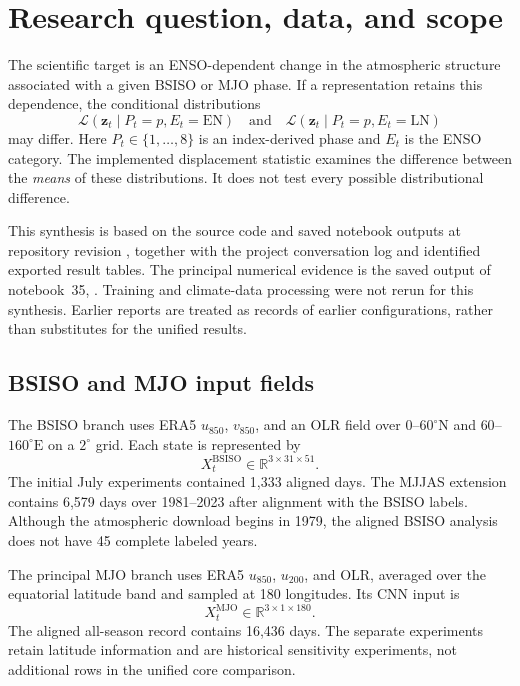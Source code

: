 \documentclass[11pt]{article}
\newcommand{\EN}{\mathrm{EN}}
\newcommand{\LN}{\mathrm{LN}}
\newcommand{\R}{\mathbb{R}}
\newcommand{\code}[1]{\texttt{\detokenize{#1}}}
\begin{document}
\section{Research question, data, and scope}
\label{sec:data}

The scientific target is an ENSO-dependent change in the atmospheric structure associated with a given BSISO or MJO phase. If a representation retains this dependence, the conditional distributions
\begin{equation}
\mathcal{L}(\mathbf z_t\mid P_t=p,E_t=\EN)
\quad\text{and}\quad
\mathcal{L}(\mathbf z_t\mid P_t=p,E_t=\LN)
\label{eq:distributions}
\end{equation}
may differ. Here $P_t\in\{1,\ldots,8\}$ is an index-derived phase and $E_t$ is the ENSO category. The implemented displacement statistic examines the difference between the \emph{means} of these distributions. It does not test every possible distributional difference.

This synthesis is based on the source code and saved notebook outputs at repository revision \code{d0d6a12}, together with the project conversation log and identified exported result tables. The principal numerical evidence is the saved output of notebook~35, . Training and climate-data processing were not rerun for this synthesis. Earlier reports are treated as records of earlier configurations, rather than substitutes for the unified results.

\subsection{BSISO and MJO input fields}

The BSISO branch uses ERA5 $u_{850}$, $v_{850}$, and an OLR field over $0$--$60^\circ\mathrm{N}$ and $60$--$160^\circ\mathrm{E}$ on a $2^\circ$ grid. Each state is represented by
\begin{equation}
X_t^{\mathrm{BSISO}}\in\R^{3\times31\times51}.
\end{equation}
The initial July experiments contained 1,333 aligned days. The MJJAS extension contains 6,579 days over 1981--2023 after alignment with the BSISO labels. Although the atmospheric download begins in 1979, the aligned BSISO analysis does not have 45 complete labeled years.

The principal MJO branch uses ERA5 $u_{850}$, $u_{200}$, and OLR, averaged over the equatorial latitude band and sampled at 180 longitudes. Its CNN input is
\begin{equation}
X_t^{\mathrm{MJO}}\in\R^{3\times1\times180}.
\end{equation}
The aligned all-season record contains 16,436 days. The separate \code{lat16} experiments retain latitude information and are historical sensitivity experiments, not additional rows in the unified core comparison.
\end{document}
